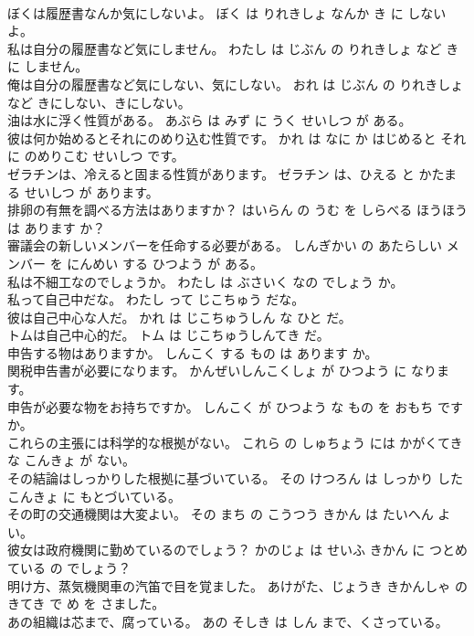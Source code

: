 \documentclass[8pt]{extreport}
\begin{document}
\begin{CJK}{UTF8}{min}
\\	ぼくは履歴書なんか気にしないよ。	ぼく は りれきしょ なんか き に しない よ。	
\\	私は自分の履歴書など気にしません。	わたし は じぶん の りれきしょ など き に しません。	
\\	俺は自分の履歴書など気にしない、気にしない。	おれ は じぶん の りれきしょ など きにしない、きにしない。	
\\	油は水に浮く性質がある。	あぶら は みず に うく せいしつ が ある。	
\\	彼は何か始めるとそれにのめり込む性質です。	かれ は なに か はじめると それ に のめりこむ せいしつ です。	
\\	ゼラチンは、冷えると固まる性質があります。	ゼラチン は、ひえる と かたまる せいしつ が あります。	
\\	排卵の有無を調べる方法はありますか？	はいらん の うむ を しらべる ほうほう は あります か？	
\\	審議会の新しいメンバーを任命する必要がある。	しんぎかい の あたらしい メンバー を にんめい する ひつよう が ある。	
\\	私は不細工なのでしょうか。	わたし は ぶさいく なの でしょう か。	
\\	私って自己中だな。	わたし って じこちゅう だな。	
\\	彼は自己中心な人だ。	かれ は じこちゅうしん な ひと だ。	
\\	トムは自己中心的だ。	トム は じこちゅうしんてき だ。	
\\	申告する物はありますか。	しんこく する もの は あります か。	
\\	関税申告書が必要になります。	かんぜいしんこくしょ が ひつよう に なります。	
\\	申告が必要な物をお持ちですか。	しんこく が ひつよう な もの を おもち です か。	
\\	これらの主張には科学的な根拠がない。	これら の しゅちょう には かがくてき な こんきょ が ない。	
\\	その結論はしっかりした根拠に基づいている。	その けつろん は しっかり した こんきょ に もとづいている。	
\\	その町の交通機関は大変よい。	その まち の こうつう きかん は たいへん よい。	
\\	彼女は政府機関に勤めているのでしょう？	かのじょ は せいふ きかん に つとめている の でしょう？	
\\	明け方、蒸気機関車の汽笛で目を覚ました。	あけがた、じょうき きかんしゃ の きてき で め を さました。	
\\	あの組織は芯まで、腐っている。	あの そしき は しん まで、くさっている。	

\end{CJK}
\end{document}
